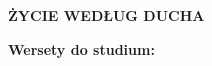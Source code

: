 \documentclass[10pt,a4paper,oneside]{article}
\begin{document}
\centerline{\textbf{\MakeUppercase{Życie według Ducha}}}
\begin{center}
\textbf{Wersety do studium:} 
\end{center}
\end{document}

